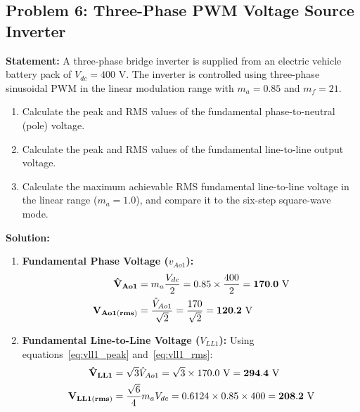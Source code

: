 \documentclass[11pt,a4paper]{article}
\begin{document}
\subsection{Problem 6: Three-Phase PWM Voltage Source Inverter}
\begin{examplebox}
\textbf{Statement:} A three-phase bridge inverter is supplied from an electric vehicle battery pack of $V_{dc} = 400\text{ V}$. The inverter is controlled using three-phase sinusoidal PWM in the linear modulation range with $m_a = 0.85$ and $m_f = 21$.
\begin{enumerate}
  \item Calculate the peak and RMS values of the fundamental phase-to-neutral (pole) voltage.
  \item Calculate the peak and RMS values of the fundamental line-to-line output voltage.
  \item Calculate the maximum achievable RMS fundamental line-to-line voltage in the linear range ($m_a = 1.0$), and compare it to the six-step square-wave mode.
\end{enumerate}

\tcblower
\textbf{Solution:}
\begin{enumerate}
  \item \textbf{Fundamental Phase Voltage ($v_{Ao1}$):}
  \begin{align*}
  \mathbf{\hat{V}_{Ao1}} &= m_a \frac{V_{dc}}{2} = 0.85 \times \frac{400}{2} = \mathbf{170.0\text{ V}} \notag\\
  \mathbf{V_{Ao1(rms)}} &= \frac{\hat{V}_{Ao1}}{\sqrt{2}} = \frac{170}{\sqrt{2}} = \mathbf{120.2\text{ V}}
  \end{align*}

  \item \textbf{Fundamental Line-to-Line Voltage ($V_{LL1}$):}
  Using equations~\eqref{eq:vll1_peak} and~\eqref{eq:vll1_rms}:
  \begin{align*}
  \mathbf{\hat{V}_{LL1}} &= \sqrt{3} \hat{V}_{Ao1} = \sqrt{3} \times 170.0\text{ V} = \mathbf{294.4\text{ V}} \notag\\
  \mathbf{V_{LL1(rms)}} &= \frac{\sqrt{6}}{4} m_a V_{dc} = 0.6124 \times 0.85 \times 400 = \mathbf{208.2\text{ V}}
  \end{align*}


\end{enumerate}
\end{examplebox}
\end{document}
